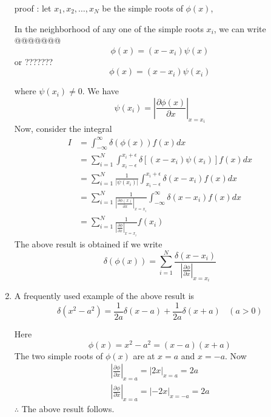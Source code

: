 \begin{enumerate}[label=\textbf{Property \arabic*},start=1]
			proof : let $x_1 , x_2, \ldots , x_N$ be the simple roots of $\phi(x)$,
			
			
			In the neighborhood of any one of the simple roots $x_i$, we can write
			@@@@@@@
			\begin{equation}
				\phi(x) = (x - x_i) \psi(x)
			\end{equation}
			or ???????
			\begin{equation}
				\phi(x) = (x - x_i) \psi(x_i)
			\end{equation}
			
			where $\psi(x_i) \neq 0$. We have
			\begin{equation}
				\psi(x_i) = \left|\frac{\partial \phi(x)}{\partial x} \right|_{x=x_i}
			\end{equation}
			Now, consider the integral
			\begin{eqnarray}
				I &= \int_{-\infty}^{\infty} \delta(\phi(x)) f(x) dx  \nonumber \\
				&= \sum_{i=1}^{N} \int_{x_i - \epsilon}^{x_i + \epsilon} \delta[(x-x_i) \psi(x_i)] f(x) dx \nonumber \\
				&= \sum_{i=1}^{N} \frac{1}{|\psi(x_i)|}\int_{x_i - \epsilon}^{x_i + \epsilon} \delta(x-x_i) f(x) dx \nonumber \\
				&= \sum_{i=1}^{N} \frac{1}{ \left|\frac{\partial \phi(x)}{\partial x} \right|_{x=x_i}}\int_{-\infty}^{\infty} \delta(x-x_i) f(x) dx \nonumber \\
				&= \sum_{i=1}^{N} \frac{1}{ \left|\frac{\partial \phi}{\partial x} \right|_{x=x_i}} f(x_i) \nonumber
			\end{eqnarray}
			The above result is obtained if we write
			\begin{equation}
				\delta(\phi(x)) = \sum_{i=1}^{N} \frac{\delta(x - x_i)}{\left|\frac{\partial \phi}{\partial x}\right|_{x=x_i}}
			\end{equation}
			
			
			\item
			A frequently used example of the above result is
			\begin{equation}
				\delta(x^2 - a^2) = \frac{1}{2 a} \delta(x - a) + \frac{1}{2 a} \delta(x + a) \ \ \ \ (a > 0)
			\end{equation}
			
			Here
			\begin{equation}
				\phi(x) = x^2 - a^2 = (x-a)(x+a)
			\end{equation}
				The two simple roots of $\phi(x)$ are at $x=a $ and $x=-a$. Now
				\begin{eqnarray}
					\left|\frac{\partial \phi}{\partial x}\right|_{x=a} = \left|2 x\right|_{x=a} = 2a  \\
					\left|\frac{\partial \phi}{\partial x}\right|_{x=a} = \left|-2 x\right|_{x=-a} = 2a 
				\end{eqnarray}
				$\therefore$ The above result follows.
				

\end{enumerate}
